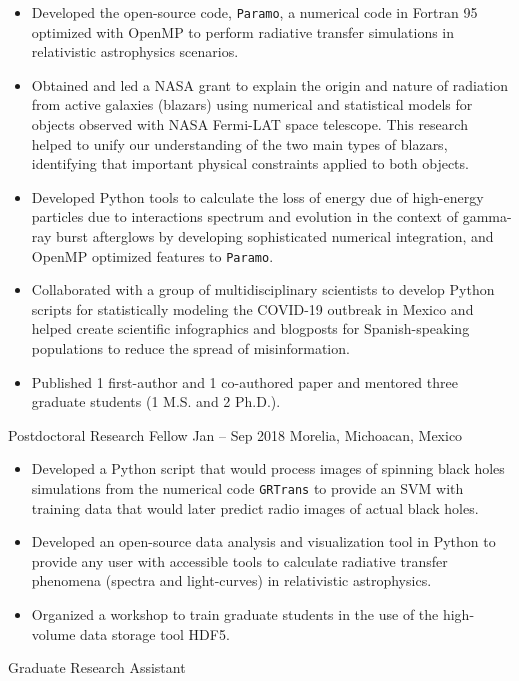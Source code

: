 {%
\begin{itemize}
    \item Developed the open-source code, \texttt{Paramo}, a numerical code in Fortran 95 optimized with OpenMP to perform radiative transfer simulations in relativistic astrophysics scenarios.
    \item Obtained and led a NASA grant to explain the origin and nature of radiation from active galaxies (blazars) using  numerical and statistical models for objects observed with NASA Fermi-LAT space telescope. This research helped to unify our understanding of the two main types of blazars, identifying that important physical constraints applied to both objects.
    \item Developed Python tools to calculate the loss of energy due of high-energy particles due to interactions spectrum and evolution in the context of gamma-ray burst afterglows by developing sophisticated numerical integration, and OpenMP optimized features to \texttt{Paramo}.
    \item Collaborated with a group of multidisciplinary scientists to develop Python scripts for statistically modeling the COVID-19 outbreak in Mexico and helped create scientific infographics and blogposts for Spanish-speaking populations to reduce the spread of misinformation.
    \item Published 1 first-author and 1 co-authored paper and mentored three graduate students (1 M.S. and 2 Ph.D.).
\end{itemize}
}
\cventry{}%
{\UMSNHes}%
{Postdoctoral Research Fellow}%
{Jan -- Sep 2018}%
{Morelia, Michoacan, Mexico}%
{%
\begin{itemize}
    \item Developed a Python script that would process images of spinning black holes simulations from  the numerical code \texttt{GRTrans} to provide an SVM with training data that would later predict radio images of actual black holes.
    \item Developed an open-source data analysis and visualization tool in Python to provide any user with accessible tools to calculate radiative transfer phenomena (spectra and light-curves) in relativistic astrophysics.
    \item Organized a workshop to train graduate students in the use of the high-volume data storage tool HDF5.
\end{itemize}
}
\cventry{}%
{\UVval}%
{Graduate Research Assistant}%
